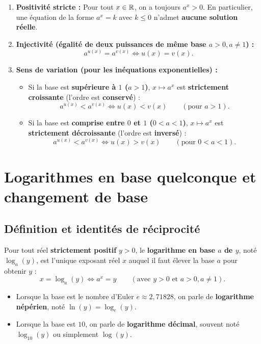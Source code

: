 \begin{theoreme}
\begin{enumerate}
    \item \textbf{Positivité stricte :} Pour tout $x \in \mathbb{R}$, on a toujours $\boxed{a^x > 0}$. En particulier, une équation de la forme $a^x = k$ avec $k \le 0$ n'admet \textbf{aucune solution réelle}.
    \item \textbf{Injectivité (égalité de deux puissances de même base $a > 0, a \neq 1$) :}
    \[
        \boxed{a^{u(x)} = a^{v(x)} \iff u(x) = v(x)}.
    \]
    \item \textbf{Sens de variation (pour les inéquations exponentielles) :}
    \begin{itemize}
        \item Si la base est \textbf{supérieure à $1$ ($a > 1$)}, $x \mapsto a^x$ est \textbf{strictement croissante} (l'ordre est \textbf{conservé}) :
        \[
            \boxed{a^{u(x)} < a^{v(x)} \iff u(x) < v(x) \qquad (\text{pour } a > 1)}.
        \]
        \item Si la base est \textbf{comprise entre $0$ et $1$ ($0 < a < 1$)}, $x \mapsto a^x$ est \textbf{strictement décroissante} (l'ordre est \textbf{inversé}) :
        \[
            \boxed{a^{u(x)} < a^{v(x)} \iff u(x) > v(x) \qquad (\text{pour } 0 < a < 1)}.
        \]
    \end{itemize}
\end{enumerate}
\end{theoreme}

\section{Logarithmes en base quelconque et changement de base}

\subsection{Définition et identités de réciprocité}

\begin{definition}
Pour tout réel \textbf{strictement positif} $y > 0$, le \textbf{logarithme en base $a$ de $y$}, noté $\log_a(y)$, est l'unique exposant réel $x$ auquel il faut élever la base $a$ pour obtenir $y$ :
\[
    \boxed{x = \log_a(y) \iff a^x = y \qquad (\text{avec } y > 0 \text{ et } a > 0, a \neq 1)}.
\]
\begin{itemize}
    \item Lorsque la base est le nombre d'Euler $e \approx 2,71828$, on parle de \textbf{logarithme népérien}, noté $\ln(y) = \log_e(y)$.
    \item Lorsque la base est $10$, on parle de \textbf{logarithme décimal}, souvent noté $\log_{10}(y)$ ou simplement $\log(y)$.
\end{itemize}
\end{definition}

